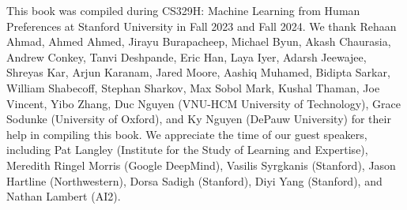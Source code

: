\documentclass[
  letterpaper,
  numbers=noenddot,
  DIV=11]{scrreprt}
\theoremstyle{plain}
\theoremstyle{definition}
\theoremstyle{remark}
\begin{document}
This book was compiled during CS329H: Machine Learning from Human
Preferences at Stanford University in Fall 2023 and Fall 2024. We thank
Rehaan Ahmad, Ahmed Ahmed, Jirayu Burapacheep, Michael Byun, Akash
Chaurasia, Andrew Conkey, Tanvi Deshpande, Eric Han, Laya Iyer, Adarsh
Jeewajee, Shreyas Kar, Arjun Karanam, Jared Moore, Aashiq Muhamed,
Bidipta Sarkar, William Shabecoff, Stephan Sharkov, Max Sobol Mark,
Kushal Thaman, Joe Vincent, Yibo Zhang, Duc Nguyen (VNU-HCM University
of Technology), Grace Sodunke (University of Oxford), and Ky Nguyen
(DePauw University) for their help in compiling this book. We appreciate
the time of our guest speakers, including Pat Langley (Institute for the
Study of Learning and Expertise), Meredith Ringel Morris (Google
DeepMind), Vasilis Syrgkanis (Stanford), Jason Hartline (Northwestern),
Dorsa Sadigh (Stanford), Diyi Yang (Stanford), and Nathan Lambert (AI2).

\label{3ade8a4a-fb1d-4a6c-8409-ac45482d5fc9}










\printindex
\restoregeometry{}
\end{document}
